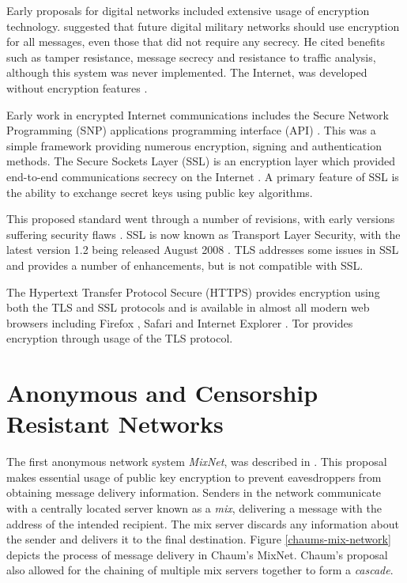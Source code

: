 \documentclass{ecuthesis}
\begin{document}
Early proposals for digital networks included extensive usage of encryption
technology. \textcite{Baran:1964p384} suggested that future digital military
networks should use encryption for all messages, even those that did not
require any secrecy. He cited benefits such as tamper resistance, message
secrecy and resistance to traffic analysis, although this system was never
implemented. The Internet, was developed without encryption features
\parencite{website:internet}.

Early work in encrypted Internet communications includes the Secure Network
Programming (SNP) applications programming interface (API)
\parencite{Woo:1994p2532}. This was a simple framework providing numerous
encryption, signing and authentication methods. The Secure Sockets Layer (SSL)
is an encryption layer which provided end-to-end communications secrecy on the
Internet \parencite{website:SSL}. A primary feature of SSL is the ability to
exchange secret keys using public key algorithms.

This proposed standard went through a number of revisions, with early versions
suffering security flaws \parencite{Wagner:1996p385}. SSL is now known as
Transport Layer Security, with the latest version 1.2 being released August
2008 \parencite{website:TLS}. TLS addresses some issues in SSL and provides a
number of enhancements, but is not compatible with SSL.

The Hypertext Transfer Protocol Secure (HTTPS) provides encryption using both
the TLS and SSL protocols \parencite{website:HTTPS} and is available in almost
all modern web browsers including Firefox
\parencite{website:firefox-encryption}, Safari
\parencite{website:safari-features} and Internet Explorer
\parencite{website:microsoft-tls}. Tor provides encryption through usage of the
TLS protocol.

\section{Anonymous and Censorship Resistant Networks}

The first anonymous network system \emph{MixNet}, was described in
\textcite{Chaum:1981p296}. This proposal makes essential usage of public key
encryption to prevent eavesdroppers from obtaining message delivery
information. Senders in the network communicate with a centrally located server
known as a \emph{mix}, delivering a message with the address of the intended
recipient. The mix server discards any information about the sender and
delivers it to the final destination. Figure \ref{chaums-mix-network} depicts
the process of message delivery in Chaum's MixNet. Chaum's proposal also
allowed for the chaining of multiple mix servers together to form a
\emph{cascade}.
\end{document}
